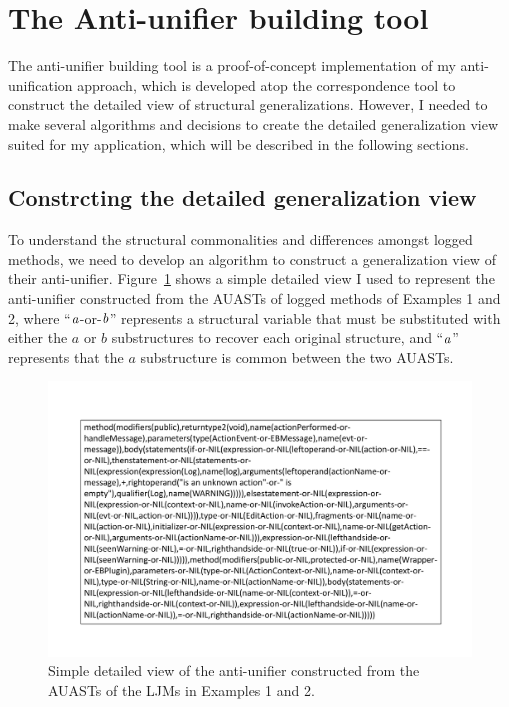 \section{The Anti-unifier building tool} \label{antiunifierTool}
The anti-unifier building tool is a proof-of-concept implementation of my anti-unification approach, which is developed atop the correspondence tool to construct the detailed view of structural generalizations. However, I needed to make several algorithms and decisions to create the detailed generalization view suited for my application, which will be described in the following sections.


\subsection{Constrcting the detailed generalization view} \label{meth-detailed-view}
To understand the structural commonalities and differences amongst logged methods, we need to develop an algorithm to construct a generalization view of their anti-unifier. Figure~\ref{fig:meth-anti-unifier} shows a simple detailed view I used to represent the anti-unifier constructed from the AUASTs of logged methods of Examples 1 and 2, where ``$\mathit{a}$-or-$\mathit{b}$'' represents a structural variable that must be substituted with either the $a$ or $b$ substructures to recover each original structure, and ``$\mathit{a}$'' represents that the $a$ substructure is common between the two AUASTs.




\begin{figure} [H]
  \centering\includegraphics [scale=0.5]{Drawing4/auMethod.pdf}
  \caption{Simple detailed view of the anti-unifier constructed from the AUASTs of the LJMs in Examples 1 and 2.}
  \label{fig:meth-anti-unifier}
\end{figure} 


